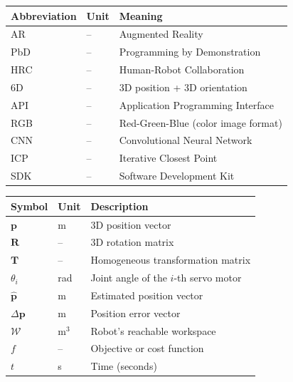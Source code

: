 \setlength{\tabcolsep}{5mm}
\renewcommand{\arraystretch}{1.15}
\begin{longtable}{lll}
\textbf{Abbreviation} & \textbf{Unit} & \textbf{Meaning} \\
\hline
AR   & -- & Augmented Reality \\
PbD  & -- & Programming by Demonstration \\
HRC  & -- & Human-Robot Collaboration \\
6D   & -- & 3D position + 3D orientation \\
API  & -- & Application Programming Interface \\
RGB  & -- & Red-Green-Blue (color image format) \\
CNN  & -- & Convolutional Neural Network \\
ICP  & -- & Iterative Closest Point \\
SDK  & -- & Software Development Kit \\
\end{longtable}

\setlength{\tabcolsep}{5mm}
\renewcommand{\arraystretch}{1.15}
\begin{longtable}{lll}
\textbf{Symbol} & \textbf{Unit} & \textbf{Description} \\
\hline
$\mathbf{p}$         & m       & 3D position vector \\
$\mathbf{R}$         & --      & 3D rotation matrix \\
$\mathbf{T}$         & --      & Homogeneous transformation matrix \\
$\theta_i$           & rad     & Joint angle of the $i$-th servo motor \\
$\hat{\mathbf{p}}$   & m       & Estimated position vector \\
$\Delta \mathbf{p}$  & m       & Position error vector \\
$\mathcal{W}$        & m$^3$   & Robot's reachable workspace \\
$f$                  & --      & Objective or cost function \\
$t$                  & s       & Time (seconds) \\
\end{longtable}
